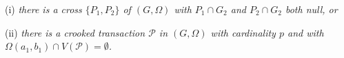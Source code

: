 \hspace*{12pt}(i) \textit{there is a cross $\{P_1, P_2\}$ of $(G, \Omega)$ with $P_1 \cap G_2$ and $P_2 \cap G_2$ both null, or}

\hspace*{12pt}(ii) \textit{there is a crooked transaction $\mathcal{P}$ in $(G, \Omega)$ with cardinality $p$ and with $\Omega(a_1, b_1) \cap V(\mathcal{P}) = \emptyset$.}
